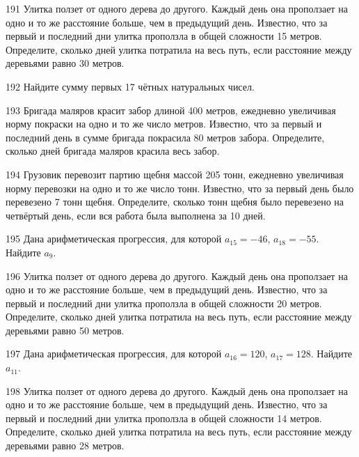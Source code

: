 \documentclass[4apaper]{article}
\begin{document}
\begin{taskBN}{191}
 Улитка ползет от одного дерева до другого. Каждый день она проползает на одно и то же расстояние больше, чем в предыдущий день. Известно, что за первый и последний дни улитка проползла в общей сложности 15 метров. Определите, сколько дней улитка потратила на весь путь, если расстояние между деревьями равно 30 метров.
\end{taskBN}

\begin{taskBN}{192}
Найдите сумму первых 17 чётных натуральных чисел.
\end{taskBN}

\begin{taskBN}{193}
 Бригада маляров красит забор длиной 400 метров, ежедневно увеличивая норму покраски на одно и то же число метров. Известно, что за первый и последний день в сумме бригада покрасила 80 метров забора.  Определите, сколько дней бригада маляров красила весь забор. 
\end{taskBN}

\begin{taskBN}{194}
Грузовик перевозит партию щебня массой 205 тонн, ежедневно увеличивая норму перевозки на одно и то же число тонн. Известно, что за первый день было перевезено 7 тонн щебня. Определите, сколько тонн щебня было перевезено на четвёртый день, если вся работа была выполнена за 10 дней.
\end{taskBN}

\begin{taskBN}{195}
Дана арифметическая прогрессия, для которой $a_{15} = -46$, $a_{18} = -55$. Найдите $a_{9}$.
\end{taskBN}

\begin{taskBN}{196}
 Улитка ползет от одного дерева до другого. Каждый день она проползает на одно и то же расстояние больше, чем в предыдущий день. Известно, что за первый и последний дни улитка проползла в общей сложности 20 метров. Определите, сколько дней улитка потратила на весь путь, если расстояние между деревьями равно 50 метров.
\end{taskBN}

\begin{taskBN}{197}
Дана арифметическая прогрессия, для которой $a_{16} = 120$, $a_{17} = 128$. Найдите $a_{11}$.
\end{taskBN}

\begin{taskBN}{198}
 Улитка ползет от одного дерева до другого. Каждый день она проползает на одно и то же расстояние больше, чем в предыдущий день. Известно, что за первый и последний дни улитка проползла в общей сложности 14 метров. Определите, сколько дней улитка потратила на весь путь, если расстояние между деревьями равно 28 метров.
\end{taskBN}
\end{document}
